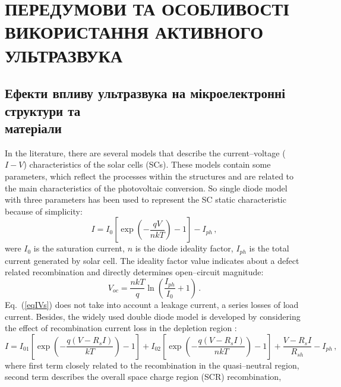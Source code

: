 \chapter{\MakeUppercase{Передумови та особливості використання активного ультразвука}}



\section{Ефекти впливу ультразвука на мікроелектронні структури та \\ матеріали \label{Oglyad}}
\cite{Sachenko2016,TAYYIB201221,FeB_Wilson,FeB_Walz,FeB_Zong,Breitenstein2013,SINKE2019,Wijaranakula,Narland,Sakauchi,Si_Auger,FeBLight,FeBLight2,FeB:Schmidt,FeBLight3,FeBCoDop,FeBDecay}

In the literature, there are several models that describe the current--voltage ($I-V$) characteristics of the solar cells (SCs).
These models contain some parameters, which reflect the processes within the structures and are related to the main characteristics of the photovoltaic conversion.
So single diode model with three parameters has been used to represent the SC static characteristic because of simplicity:
\begin{equation}
\label{eqIVs}
    I=I_{0}\left[\exp\left(-\frac{qV}{nkT}\right)-1\right]-I_{ph}\,,
\end{equation}
were
$I_0$ is the saturation current,
$n$ is the diode ideality factor,
$I_{ph}$ is the total current generated by solar cell.
The ideality factor value indicates about a defect related recombination and directly determines open--circuit magnitude:
\begin{equation}
\label{eqVoc}
    V_{oc}=\frac{nkT}{q}\ln\left(\frac{I_{ph}}{I_0}+1\right)\,.
\end{equation}
Eq.~(\ref{eqIVs}) does not take into account a leakage current, a series losses of load current.
Besides, the widely used double diode model is developed by considering the effect of recombination current loss
in the depletion region \cite{2Diod:Ishaque,2Diod:Buhler,Breitenstein2013}:
\begin{equation}
\label{eqIVd}
    I=I_{01}\left[\exp\left(-\frac{q(V-R_sI)}{kT}\right)-1\right]
      + I_{02}\left[\exp\left(-\frac{q(V-R_sI)}{nkT}\right)-1\right]
      +\frac{V-R_sI}{R_{sh}}
      -I_{ph}\,,
\end{equation}
where
first term closely related to the recombination in the quasi--neutral region,
second term describes the overall space charge region (SCR) recombination,
